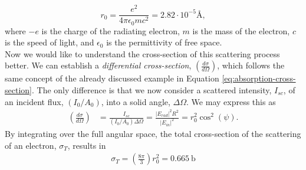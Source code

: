 \begin{equation}
r_0 = \frac{e^2}{4\pi \epsilon_0 m c^2} = 2.82\cdot 10^{-5}\si{\angstrom},
\label{eq:thomson-scattering-length}
\end{equation}
where $-e$ is the charge of the radiating electron, $m$ is the mass of the electron, $c$ is the speed of light, and $\epsilon_0$ is the permittivity of free space.\\[1\baselineskip]
%
Now we would like to understand the cross-section of this scattering process better. We can establish a \textit{differential cross-section}, $\left(\tfrac{d\sigma}{d\Omega}\right)$, which follows the same concept of the already discussed example in Equation \eqref{eq:absorption-cross-section}. The only difference is that we now consider a scattered intensity, $I_{sc}$, of an incident flux, $\left(I_{0}/A_{0}\right)$, into a solid angle, $\Delta \Omega$. We may express this as
\begin{align}
\left(\frac{d\sigma}{d\Omega}\right)&=\frac{I_{sc}}{\left(I_{0}/A_{0}\right)\Delta\Omega}=\frac{\left|E_{rad}\right|^2 R^2}{\left|E_{in}\right|^2}=r_0^2 \cos^{2}\left(\psi\right).
\label{eq:scattering-crosssection}
\end{align}
By integrating over the full angular space, the total cross-section of the scattering of an electron, $\sigma_{T}$, results in
\begin{align}
\sigma_{T} = \left(\frac{8\pi}{3}\right) r_{0}^{2} = \SI{0.665}{\barn}
\label{eq:Thomson-cross-section}
\end{align}
